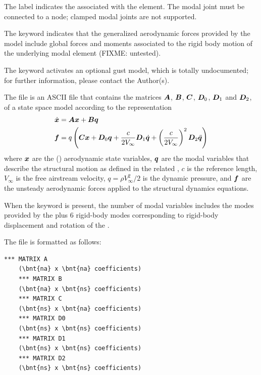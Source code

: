 The label  indicates
the 
associated with the  element.
The modal joint must be connected to a  node;
clamped modal joints are not supported.

The keyword  indicates that the generalized aerodynamic forces
provided by the model include global forces and moments associated
to the rigid body motion of the underlying modal element (FIXME: untested).

The keyword  activates an optional gust model,
which is totally undocumented;
for further information, please contact the Author(s).

The  file is an ASCII file that contains
the matrices $\boldsymbol{A}$, $\boldsymbol{B}$, $\boldsymbol{C}$, $\boldsymbol{D}_0$, $\boldsymbol{D}_1$ and $\boldsymbol{D}_2$,
of a state space model according to the representation
\begin{align*}
	\dot{\boldsymbol{x}}
	&=
	\boldsymbol{A}\boldsymbol{x} + \boldsymbol{B}\boldsymbol{q}
	\\
	\boldsymbol{f}
	&=
	q\left( \boldsymbol{C}\boldsymbol{x} + \boldsymbol{D}_0 \boldsymbol{q} + \frac{c}{2V_{\infty}} \boldsymbol{D}_1 \dot{\boldsymbol{q}} + \left( \frac{c}{2V_{\infty}} \right)^2 \boldsymbol{D}_2 \ddot{\boldsymbol{q}} \right)
\end{align*}
where $\boldsymbol{x}$ are the  ()
aerodynamic state variables,
$\boldsymbol{q}$ are the  modal variables that describe the structural motion
as defined in the related ,
$c$ is the reference length, $V_\infty$ is the free airstream velocity,
$q = \rho V_{\infty}^2/2$ is the dynamic pressure,
and $\boldsymbol{f}$ are the unsteady aerodynamic forces applied to the structural
dynamics equations.

When the keyword  is present, the number of modal variables 
includes the modes provided
by the 
plus 6 rigid-body modes corresponding to rigid-body displacement
and rotation of the .

The file is formatted as follows:
\begin{Verbatim}[commandchars=\\\{\}]
    *** MATRIX A
    (\bnt{na} x \bnt{na} coefficients)
    *** MATRIX B
    (\bnt{na} x \bnt{ns} coefficients)
    *** MATRIX C
    (\bnt{ns} x \bnt{na} coefficients)
    *** MATRIX D0
    (\bnt{ns} x \bnt{ns} coefficients)
    *** MATRIX D1
    (\bnt{ns} x \bnt{ns} coefficients)
    *** MATRIX D2
    (\bnt{ns} x \bnt{ns} coefficients)
\end{Verbatim}

